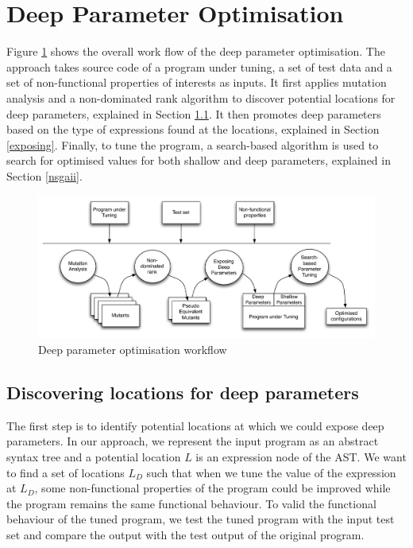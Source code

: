 \section{Deep Parameter Optimisation}

Figure \ref{system} shows the overall work flow of the deep parameter optimisation. The approach takes source code of a program under tuning, a set of test data and a set of non-functional properties of interests as inputs. 
It first applies mutation analysis and a non-dominated rank algorithm to discover potential locations for deep parameters, explained in Section \ref{discovering}. It then promotes deep parameters based on the type of expressions found at the locations, explained in Section \ref{exposing}. Finally, to tune the program, a search-based algorithm is used to search for optimised values for both shallow and deep parameters, explained in Section \ref{nsgaii}.

\begin{figure}[htbp]
\centering
\includegraphics[width=6.2in]{pics/new_system}
\caption{Deep parameter optimisation workflow}\label{system}
\end{figure}

\subsection{Discovering locations for deep parameters}
\label{discovering}
The first step is to identify potential locations at which we could expose deep parameters. 
In our approach, we represent the input program as an abstract syntax tree and a potential location $L$ is an expression node of the AST. 
We want to find a set of locations $L_D$ such that when we tune the value of the expression at $L_D$, some non-functional properties of the program could be improved while the program remains the same functional behaviour. 
To valid the functional behaviour of the tuned program, we test the tuned program with the input test set and compare the output with the test output of the original program.

